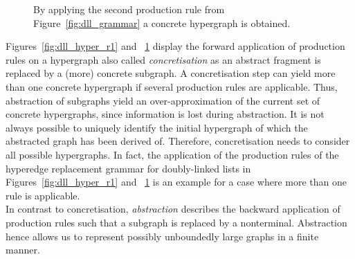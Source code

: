 \documentclass[a4paper, 12pt, twoside]{report}
\begin{document}
\begin{figure}[!h]
\begin{center}
{}
			\caption{By applying the second production rule from Figure~\ref{fig:dll_grammar} a concrete hypergraph is obtained.}\label{fig:dll_hyper_r2}
		\end{center}
	\end{figure}	

	Figures~\ref{fig:dll_hyper_r1} and ~\ref{fig:dll_hyper_r2} display the forward application of production rules on a hypergraph also called \textit{concretisation} as an abstract fragment is replaced by a (more) concrete subgraph. A concretisation step can yield more than one concrete hypergraph if several production rules are applicable. Thus, abstraction of subgraphs yield an over-approximation of the current set of concrete hypergraphs, since information is lost during abstraction. It is not always possible to uniquely identify the initial hypergraph of which the abstracted graph has been derived of. Therefore, concretisation needs to consider all possible hypergraphs. In fact, the application of the production rules of the hyperedge replacement grammar for doubly-linked lists in Figures~\ref{fig:dll_hyper_r1} and ~\ref{fig:dll_hyper_r2} is an example for a case where more than one rule is applicable. \\
	
	In contrast to concretisation, \textit{abstraction} describes the backward application of production rules such that a subgraph is replaced by a nonterminal. Abstraction hence allows us to represent possibly unboundedly large graphs in a finite manner.\\
	
\end{document}
